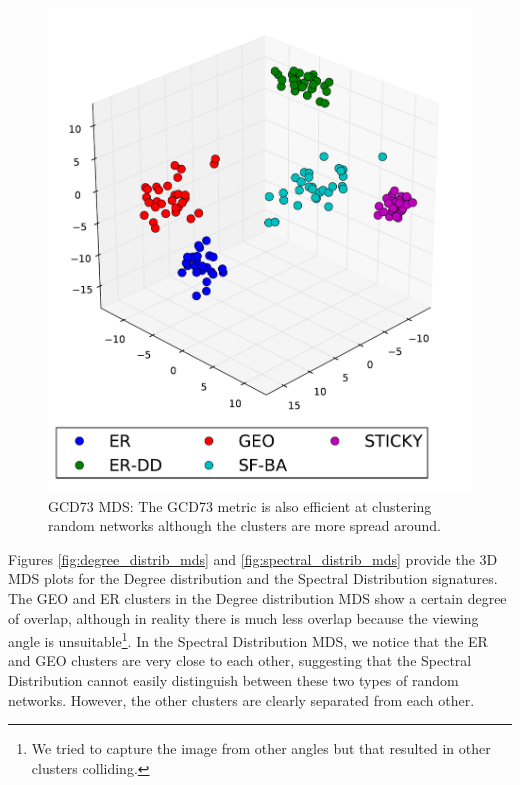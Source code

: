 \begin{figure}[H]
\begin{minipage}[b]{0.55\linewidth}
    \includegraphics[scale=0.45]
    {../code/final_results/trade_2010_thresholded/eval_results/gcd73_mds.pdf}
    \caption[Graphlet correlation distance (GCD73) MDS]{GCD73 MDS: The GCD73 metric is also efficient at clustering random networks although the clusters are more spread around.}
    \label{fig:gcd73_mds}
  \end{minipage} 
  \label{fig:rgfd_gdv_mds}
\end{figure}

Figures \ref{fig:degree_distrib_mds} and \ref{fig:spectral_distrib_mds} provide the 3D MDS plots for the Degree distribution and the Spectral Distribution signatures. The GEO and ER clusters in the Degree distribution MDS show a certain degree of overlap, although in reality there is much less overlap because the viewing angle is unsuitable\footnote{We tried to capture the image from other angles but that resulted in other clusters colliding.}. In the Spectral Distribution MDS, we notice that the ER and GEO clusters are very close to each other, suggesting that the Spectral Distribution cannot easily distinguish between these two types of random networks. However, the other clusters are clearly separated from each other.  

